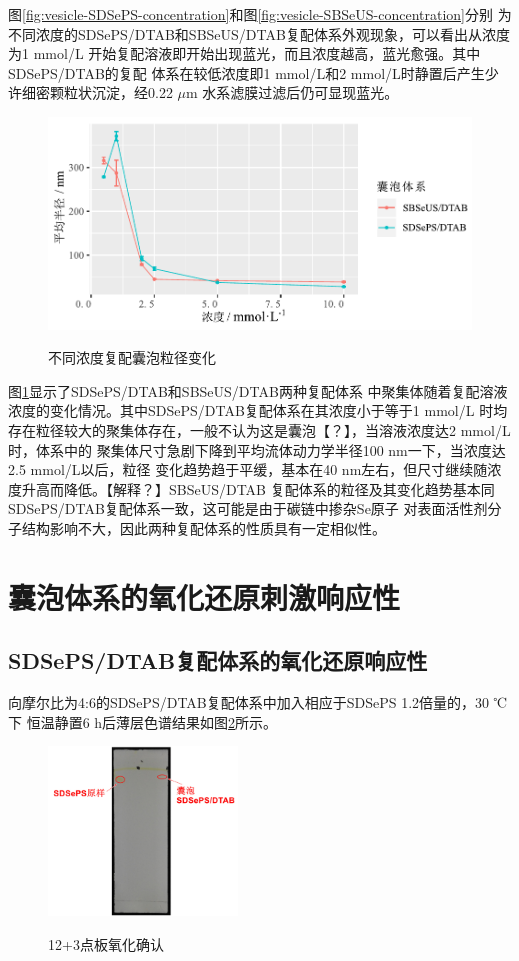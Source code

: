 \documentclass[bachelor,winfonts,replaceperiod]{jnuthesis}
\begin{document}
    图\ref{fig:vesicle-SDSePS-concentration}和图\ref{fig:vesicle-SBSeUS-concentration}分别
    为不同浓度的SDSePS/DTAB和SBSeUS/DTAB复配体系外观现象，可以看出从浓度为1 mmol/L
    开始复配溶液即开始出现蓝光，而且浓度越高，蓝光愈强。其中SDSePS/DTAB的复配
    体系在较低浓度即1 mmol/L和2 mmol/L时静置后产生少许细密颗粒状沉淀，经0.22 $\mu$m
    水系滤膜过滤后仍可显现蓝光。
    
    \begin{figure}[htbp]
        \centering
        \includegraphics[width=.825\textwidth]{Figure/vesicle-concentration-line.pdf}\\
        \caption{不同浓度复配囊泡粒径变化}\label{fig:vesicle-concentration-line}
    \end{figure}
    
    图\ref{fig:vesicle-concentration-line}显示了SDSePS/DTAB和SBSeUS/DTAB两种复配体系
    中聚集体随着复配溶液浓度的变化情况。其中SDSePS/DTAB复配体系在其浓度小于等于1 mmol/L
    时均存在粒径较大的聚集体存在，一般不认为这是囊泡【？】，当溶液浓度达2 mmol/L时，体系中的
    聚集体尺寸急剧下降到平均流体动力学半径100 nm一下，当浓度达2.5 mmol/L以后，粒径
    变化趋势趋于平缓，基本在40 nm左右，但尺寸继续随浓度升高而降低。【解释？】SBSeUS/DTAB
    复配体系的粒径及其变化趋势基本同SDSePS/DTAB复配体系一致，这可能是由于碳链中掺杂Se原子
    对表面活性剂分子结构影响不大，因此两种复配体系的性质具有一定相似性。
        
    \section{囊泡体系的氧化还原刺激响应性}
    \subsection{SDSePS/DTAB复配体系的氧化还原响应性}
    向摩尔比为4:6的SDSePS/DTAB复配体系中加入相应于SDSePS 1.2倍量的，30 ℃下
    恒温静置6 h后薄层色谱结果如图\ref{fig:SDSePS-Ox-tlc}所示。
    \begin{figure}[htbp]
        \centering
        \includegraphics[height=4.5cm]{figure/SDSePS-Ox-tlc.jpg}\\
        \caption{12+3点板氧化确认}\label{fig:SDSePS-Ox-tlc}
    \end{figure}
    
\end{document}
